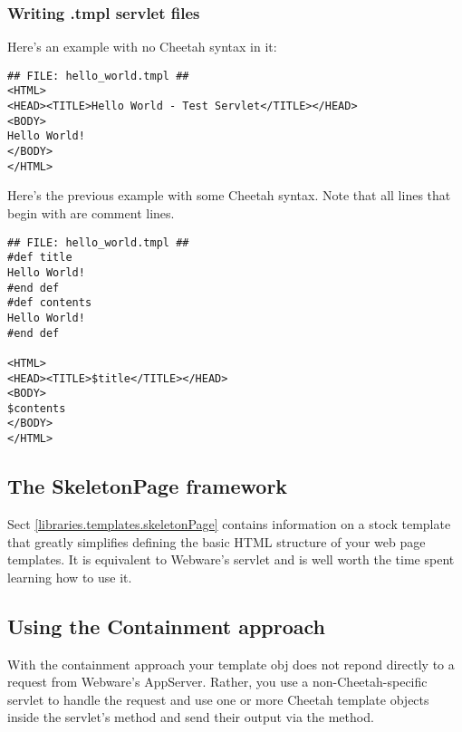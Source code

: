 \subsubsection{Writing .tmpl servlet files}
\label{webware.tmpl.writing}

Here's an example  with no Cheetah syntax in it:

\begin{verbatim}
## FILE: hello_world.tmpl ##
<HTML>
<HEAD><TITLE>Hello World - Test Servlet</TITLE></HEAD>
<BODY>
Hello World!
</BODY>
</HTML>
\end{verbatim}

Here's the previous example with some Cheetah syntax.  Note that all lines that begin with
\code{\#\#} are comment lines.

\begin{verbatim}
## FILE: hello_world.tmpl ##
#def title
Hello World!
#end def
#def contents
Hello World!
#end def

<HTML>
<HEAD><TITLE>$title</TITLE></HEAD>
<BODY>
$contents
</BODY>
</HTML>
\end{verbatim}


\subsection{The SkeletonPage framework}
\label{webware.skeletonPage}

Sect \ref{libraries.templates.skeletonPage} contains information on a stock
template that greatly simplifies defining the basic HTML structure of your web
page templates.  It is equivalent to Webware's  servlet and
is well worth the time spent learning how to use it.

\subsection{Using the Containment approach}
\label{webware.containment}

With the containment approach your template obj does not repond directly to a
request from Webware's AppServer. Rather, you use a non-Cheetah-specific servlet
to handle the request and use one or more Cheetah template objects inside the
servlet's  method and send their output via the 
 method.

